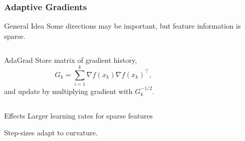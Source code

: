 \documentclass[aspectratio=1610,onlytextwidth]{beamer}
\begin{document}
\begin{frame}[c]
  \frametitle{Adaptive Gradients}

  \begin{block}{General Idea}
    Some directions may be important, but feature information is \alert{sparse}.
  \end{block}

  \pause\bigskip

  \begin{columns}
    \begin{column}{0.45\textwidth}
      \begin{block}{AdaGrad}
        Store matrix of gradient history,
        \[
          G_k = \sum_{i = 1}^k \nabla f(x_k) \nabla f(x_k)^\intercal,
        \]
        and update by multiplying gradient with $G_k^{-1/2}$.
      \end{block}
    \end{column}
    \begin{column}{0.45\textwidth}
      \begin{algorithm}[H]
        \caption{AdaGrad}
      \end{algorithm}
    \end{column}
  \end{columns}

  \pause\bigskip

  \begin{block}{Effects}
    Larger learning rates for sparse features

    \medskip

    Step-sizes adapt to curvature.
  \end{block}


\end{frame}
\end{document}
